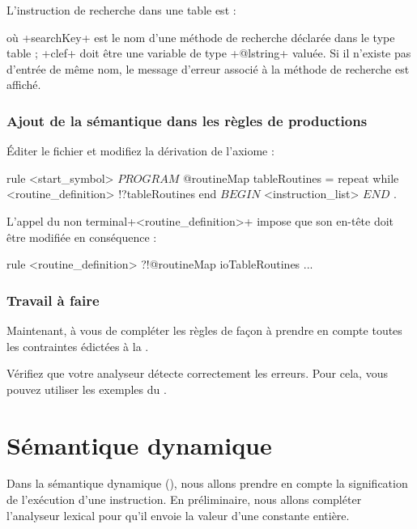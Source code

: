L'instruction de recherche dans une table est :
\begin{galgas}
\end{galgas}
où \ggs+searchKey+ est le nom d'une méthode de recherche déclarée dans le type table ; \ggs+clef+ doit être une variable de type \ggs+@lstring+ valuée. Si il n'existe pas d'entrée de même nom, le message d'erreur associé à la méthode de recherche est affiché.

\subsubsection{Ajout de la sémantique dans les règles de productions}
Éditer le fichier  et modifiez la dérivation de l'axiome :

\begin{galgas}
rule <start_symbol> {
  $PROGRAM$
  @routineMap tableRoutines = {}
  repeat
  while 
    <routine_definition> !?tableRoutines
  end
  $BEGIN$
  <instruction_list>
  $END$
  $.$
}
\end{galgas}

L'appel du non terminal\ggs+<routine_definition>+ impose que son en-tête doit être modifiée en conséquence :
\begin{galgas}
rule <routine_definition> ?!@routineMap ioTableRoutines {
  ...
}
\end{galgas}

\subsubsection{Travail à faire}
Maintenant, à vous de compléter les règles de façon à prendre en compte toutes les contraintes édictées à la .

Vérifiez que votre analyseur détecte correctement les erreurs. Pour cela, vous pouvez utiliser les exemples du .




\section{Sémantique dynamique}

Dans la sémantique dynamique (), nous allons prendre en compte la signification de l'exécution d'une instruction. En préliminaire, nous allons compléter l'analyseur lexical pour qu'il envoie la valeur d'une constante entière.

